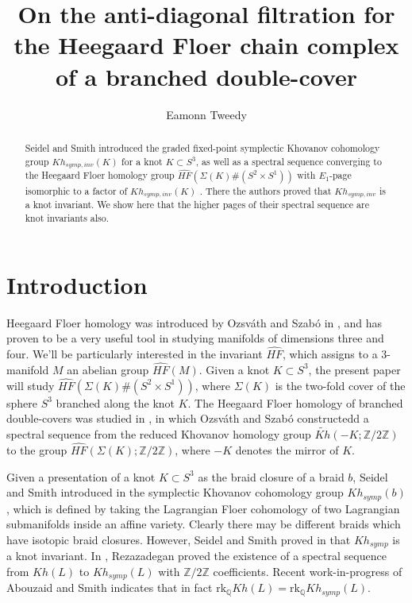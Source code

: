 \documentclass[11pt]{article}
\theoremstyle{plain} \newtheorem{thm}{Theorem}[subsection]
\theoremstyle{plain} \newtheorem{cor}[thm]{Corollary}
\theoremstyle{plain} \newtheorem{prop}[thm]{Proposition}
\theoremstyle{plain} \newtheorem{conj}[thm]{Conjecture}
\theoremstyle{plain} \newtheorem{lem}[thm]{Lemma}
\theoremstyle{definition} \newtheorem{df}[thm]{Definition}
\theoremstyle{remark} \newtheorem{rmk}[thm]{Remark}
\theoremstyle{remark} \newtheorem{obs}[thm]{Observation}
\newcommand{\DBCs}[1]{\Sigma(#1)\#(S^{2}\times S^{1})}
\newcommand{\DBC}[1]{\Sigma(#1)}
\newcommand{\tld}[1]{\widetilde{#1}}
\newcommand{\OS}{Ozsv\'ath and Szab\'o }
\newcommand{\Ks}[1]{Kh_{symp}(#1)}
\newcommand{\Zcaltwo}{\mathbb{Z}/2\mathbb{Z}}
\begin{document}
\title{On the anti-diagonal filtration for the Heegaard Floer chain complex of a branched double-cover} 
\author{Eamonn Tweedy} 
\maketitle
\begin{abstract} 
Seidel and Smith introduced the graded fixed-point symplectic Khovanov cohomology group $Kh_{symp,inv}(K)$ for a knot $K \subset S^{3}$, as well as a spectral sequence converging to the Heegaard Floer homology group $\widehat{HF}(\DBC{K}\#(S^{2}\times S^{1}))$ with $E_{1}$-page isomorphic to a factor of $Kh_{symp,inv}(K)$ \cite{ss:R2}.  There the authors proved that $Kh_{symp,inv}$ is a knot invariant.  We show here that the higher pages of their spectral sequence are knot invariants also.
\end{abstract} 


\section{Introduction}\label{sec:intro}

Heegaard Floer homology was introduced by \OS in \cite{os:disk}, and has proven to be a very useful tool in   studying manifolds of dimensions three and four.  We'll be particularly interested in the invariant $\widehat{HF}$, which assigns to a 3-manifold $M$ an abelian group $\widehat{HF}(M)$.  Given a knot $K \subset S^{3}$, the present paper will study $\widehat{HF}\left(\DBCs{K}\right)$, where $\DBC{K}$ is the two-fold cover of the sphere $S^{3}$ branched along the knot $K$.  The Heegaard Floer homology of branched double-covers was studied in \cite{os:bc}, in which \OS constructedd a spectral sequence from the reduced Khovanov homology group $\tld{Kh}\left(-K; \Zcaltwo\right)$ to the group $\widehat{HF}\left(\DBC{K}; \Zcaltwo\right)$, where $-K$ denotes the mirror of $K$.

Given a presentation of a knot $K \subset S^{3}$ as the braid closure of a braid $b$, Seidel and Smith introduced in \cite{ss:R1} the symplectic Khovanov cohomology group $\Ks{b}$, which is defined by taking the Lagrangian Floer cohomology of two Lagrangian submanifolds inside an affine variety.  Clearly there may be different braids which have isotopic braid closures.  However, Seidel and Smith proved in \cite{ss:R1} that $Kh_{symp}$ is a knot invariant.  In \cite{reza:ss}, Rezazadegan proved the existence of a spectral sequence from $Kh(L)$ to $Kh_{symp}(L)$ with $\mathbb{Z}/2\mathbb{Z}$ coefficients.  Recent work-in-progress of Abouzaid and Smith \cite{AS} indicates that in fact $\text{rk}_{\mathbb{Q}}Kh(L) = \text{rk}_{\mathbb{Q}}Kh_{symp}(L)$.
\end{document}
